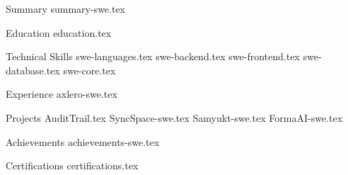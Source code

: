 \documentclass{cv_template}
\begin{document}
\begin{fitpage}

    \makecvheader

    \begin{cvsection}{Summary}
        {summary-swe.tex}
    \end{cvsection}

    \begin{cvsection}{Education}
        {education.tex}
    \end{cvsection}

    \begin{cvsection}{Technical Skills}
        {swe-languages.tex}
        {swe-backend.tex}
        {swe-frontend.tex}
        {swe-database.tex}
        {swe-core.tex}
    \end{cvsection}

    \begin{cvsection}{Experience}
        {axlero-swe.tex}
    \end{cvsection}

    \begin{cvsection}{Projects}
        {AuditTrail.tex}
        {SyncSpace-swe.tex}
        {Samyukt-swe.tex}
        {FormaAI-swe.tex}
    \end{cvsection}

    \begin{cvsection}{Achievements}
        {achievements-swe.tex}
    \end{cvsection}

    \begin{cvsection}{Certifications}
        {certifications.tex}
    \end{cvsection}

\end{fitpage}
\end{document}

